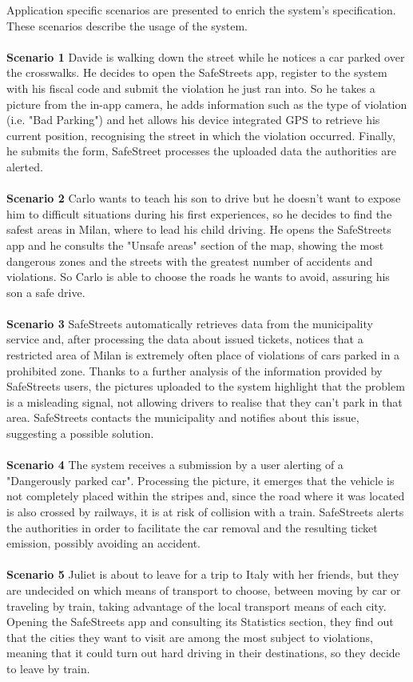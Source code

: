 Application specific scenarios are presented to enrich the system's specification. These scenarios describe the usage of the system.\\\\
\textbf{Scenario 1 \space}
\label{scenario:1}
	Davide is walking down the street while he notices a car parked over the crosswalks. He decides to open the SafeStreets app, register to the system with his fiscal code and submit the violation he just ran into. So he takes a picture from the in-app camera, he adds information such as the type of violation (i.e. "Bad Parking") and het allows his device integrated GPS to retrieve his current position, recognising the street in which the violation occurred. Finally, he submits the form, SafeStreet processes the uploaded data the authorities are alerted. \\\\
\textbf{Scenario 2 \space}
\label{scenario:2}
	Carlo wants to teach his son to drive but he doesn't want to expose him to difficult situations during his first experiences, so he decides to find the safest areas in Milan, where to lead his child driving. He opens the SafeStreets app and he consults the "Unsafe areas" section of the map, showing the most dangerous zones and the streets with the greatest number of accidents and violations. So Carlo is able to choose the roads he wants to avoid, assuring his son a safe drive. \\\\
\textbf{Scenario 3 \space}
\label{scenario:3}
	SafeStreets automatically retrieves data from the municipality service and, after processing the data about issued tickets, notices that a restricted area of Milan is extremely often place of violations of cars parked in a prohibited zone. Thanks to a further analysis of the information provided by SafeStreets users, the pictures uploaded to the system highlight that the problem is a misleading signal, not allowing drivers to realise that they can't park in that area. SafeStreets contacts the municipality and notifies about this issue, suggesting a possible solution. \\\\
\textbf{Scenario 4 \space}
\label{scenario:4}
	The system receives a submission by a user alerting of a "Dangerously parked car". Processing the picture, it emerges that the vehicle is not completely placed within the stripes and, since the road where it was located is also crossed by railways, it is at risk of collision with a train. SafeStreets alerts the authorities in order to facilitate the car removal and the resulting ticket emission, possibly avoiding an accident. \\\\
\textbf{Scenario 5 \space}
\label{scenario:5}
	Juliet is about to leave for a trip to Italy with her friends, but they are undecided on which means of transport to choose, between moving by car or traveling by train, taking advantage of the local transport means of each city. Opening the SafeStreets app and consulting its Statistics section, they find out that the cities they want to visit are among the most subject to violations, meaning that it could turn out hard driving in their destinations, so they decide to leave by train.
	
